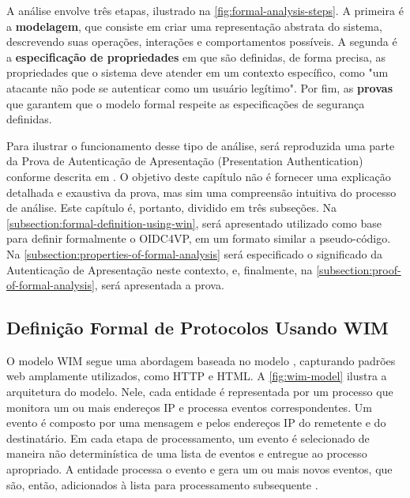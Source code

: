 A análise envolve três etapas, ilustrado na \autoref{fig:formal-analysis-steps}. A primeira é a \textbf{modelagem}, que consiste em criar uma representação abstrata do sistema, descrevendo suas operações, interações e comportamentos possíveis. A segunda é a \textbf{especificação de propriedades} em que são definidas, de forma precisa, as propriedades que o sistema deve atender em um contexto específico, como "um atacante não pode se autenticar como um usuário legítimo". Por fim, as \textbf{provas} que garantem que o modelo formal respeite as especificações de segurança definidas.



Para ilustrar o funcionamento desse tipo de análise, será reproduzida uma parte da Prova de Autenticação de Apresentação (Presentation Authentication) conforme descrita em \cite{hauck2023openid}. O objetivo deste capítulo não é fornecer uma explicação detalhada e exaustiva da prova, mas sim uma compreensão intuitiva do processo de análise. Este capítulo é, portanto, dividido em três subseções. Na \autoref{subsection:formal-definition-using-win}, será apresentado  utilizado como base para definir formalmente o \acs{OIDC4VP}, em um formato similar a pseudo-código. Na \autoref{subsection:properties-of-formal-analysis} será especificado o significado da Autenticação de Apresentação neste contexto, e, finalmente, na \autoref{subsection:proof-of-formal-analysis}, será apresentada a prova.

\subsection{Definição Formal de Protocolos Usando WIM}\label{subsection:formal-definition-using-win}

O modelo \acs{WIM} segue uma abordagem baseada no modelo , capturando padrões web amplamente utilizados, como HTTP e HTML. A \autoref{fig:wim-model} ilustra a arquitetura do modelo. Nele, cada entidade é representada por um processo que monitora um ou mais endereços IP e processa eventos correspondentes. Um evento é composto por uma mensagem e pelos endereços IP do remetente e do destinatário. Em cada etapa de processamento, um evento é selecionado de maneira não determinística de uma lista de eventos e entregue ao processo apropriado. A entidade processa o evento e gera um ou mais novos eventos, que são, então, adicionados à lista para processamento subsequente \cite{fett2024wim}.

